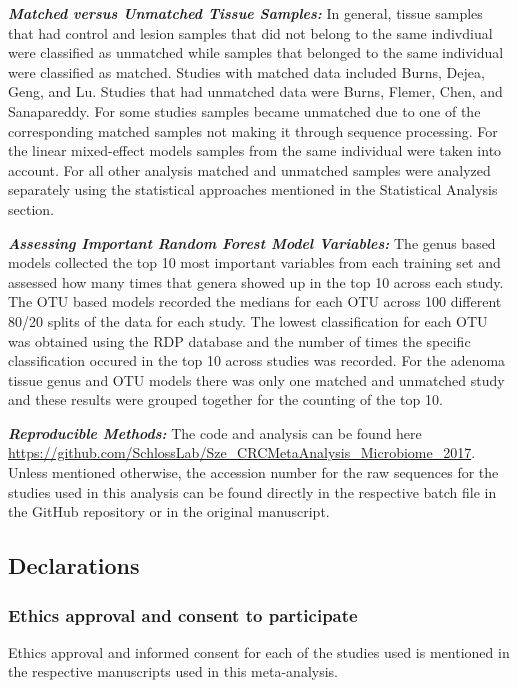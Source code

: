 \documentclass[12pt,]{article}
\begin{document}
\textbf{\emph{Matched versus Unmatched Tissue Samples:}} In general,
tissue samples that had control and lesion samples that did not belong
to the same indivdiual were classified as unmatched while samples that
belonged to the same individual were classified as matched. Studies with
matched data included Burns, Dejea, Geng, and Lu. Studies that had
unmatched data were Burns, Flemer, Chen, and Sanapareddy. For some
studies samples became unmatched due to one of the corresponding matched
samples not making it through sequence processing. For the linear
mixed-effect models samples from the same individual were taken into
account. For all other analysis matched and unmatched samples were
analyzed separately using the statistical approaches mentioned in the
Statistical Analysis section.

\textbf{\emph{Assessing Important Random Forest Model Variables:}} The
genus based models collected the top 10 most important variables from
each training set and assessed how many times that genera showed up in
the top 10 across each study. The OTU based models recorded the medians
for each OTU across 100 different 80/20 splits of the data for each
study. The lowest classification for each OTU was obtained using the RDP
database and the number of times the specific classification occured in
the top 10 across studies was recorded. For the adenoma tissue genus and
OTU models there was only one matched and unmatched study and these
results were grouped together for the counting of the top 10.

\textbf{\emph{Reproducible Methods:}} The code and analysis can be found
here
\url{https://github.com/SchlossLab/Sze_CRCMetaAnalysis_Microbiome_2017}.
Unless mentioned otherwise, the accession number for the raw sequences
for the studies used in this analysis can be found directly in the
respective batch file in the GitHub repository or in the original
manuscript.

\newpage

\subsection{Declarations}\label{declarations}

\subsubsection{Ethics approval and consent to
participate}\label{ethics-approval-and-consent-to-participate}

Ethics approval and informed consent for each of the studies used is
mentioned in the respective manuscripts used in this meta-analysis.
\end{document}
